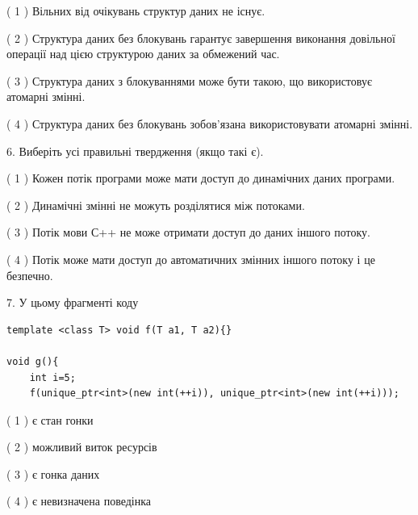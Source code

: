 \documentclass[12pt, ukrainian]{article}
\begin{document}
\begin {large}
{( 1 ) Вільних від очікувань структур даних не існує.%

( 2 ) Структура даних без блокувань гарантує завершення виконання довільної операції над цією структурою даних за обмежений час.%

( 3 ) Структура даних з блокуваннями може бути такою, що використовує атомарні змінні.%

( 4 ) Структура даних без блокувань зобов’язана використовувати атомарні змінні.%
\newpage



\vspace{5mm}
6. Виберіть усі правильні твердження (якщо такі є).\par
\vspace{2mm}

( 1 ) Кожен потік програми може мати доступ до динамічних даних програми.%

( 2 ) Динамічні змінні не можуть розділятися між потоками.%

( 3 ) Потік мови С++ не може отримати доступ до даних іншого потоку.%

( 4 ) Потік може мати доступ до автоматичних змінних іншого потоку і це безпечно.%


\vspace{5mm}
7. У цьому фрагменті коду
\begin{verbatim}
template <class T> void f(T a1, T a2){}

void g(){
    int i=5;
    f(unique_ptr<int>(new int(++i)), unique_ptr<int>(new int(++i)));
\end{verbatim}

( 1 ) є стан гонки%

( 2 ) можливий виток ресурсів%

( 3 ) є гонка даних%

( 4 ) є невизначена поведінка%
}
\end {large}
\end{document}
